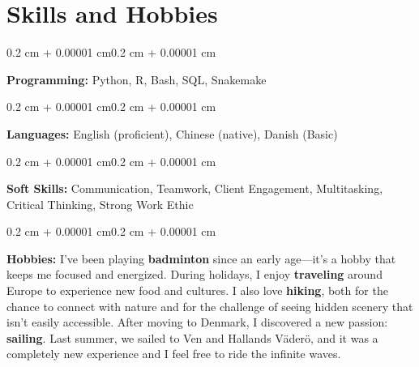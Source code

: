 \documentclass[10pt, letterpaper]{article}
\newenvironment{onecolentry}{
    \begin{adjustwidth}{0.2 cm + 0.00001 cm}{0.2 cm + 0.00001 cm}
}{
    \end{adjustwidth}
}
\begin{document}
    \section{Skills and Hobbies}

        \begin{onecolentry}
            \textbf{Programming:} Python, R, Bash, SQL, Snakemake
        \end{onecolentry}

        \vspace{0.2 cm}

        \begin{onecolentry}
            \textbf{Languages:} English (proficient), Chinese (native), Danish (Basic)
        \end{onecolentry}

        \vspace{0.2 cm}

        \begin{onecolentry}
            \textbf{Soft Skills:} Communication, Teamwork, Client Engagement, Multitasking, Critical Thinking, Strong Work Ethic
        \end{onecolentry}

        \vspace{0.2 cm}

        \begin{onecolentry}
            \textbf{Hobbies:}
            I've been playing \textbf{badminton} since an early age---it's a hobby that keeps me focused and energized. During holidays, I enjoy \textbf{traveling} around Europe to experience new food and cultures. I also love \textbf{hiking}, both for the chance to connect with nature and for the challenge of seeing hidden scenery that isn't easily accessible. After moving to Denmark, I discovered a new passion: \textbf{sailing}. Last summer, we sailed to Ven and Hallands Väderö, and it was a completely new experience and I feel free to ride the infinite waves.
        \end{onecolentry}
\end{document}
